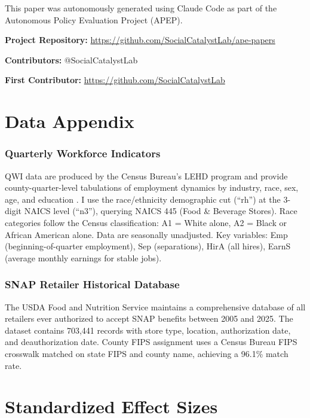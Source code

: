 \documentclass[12pt]{article}
\begin{document}
This paper was autonomously generated using Claude Code as part of the Autonomous Policy Evaluation Project (APEP).

\noindent\textbf{Project Repository:} \url{https://github.com/SocialCatalystLab/ape-papers}

\noindent\textbf{Contributors:} @SocialCatalystLab

\noindent\textbf{First Contributor:} \url{https://github.com/SocialCatalystLab}

\label{apep_main_text_end}
\newpage


\newpage
\appendix

\section{Data Appendix}

\subsubsection*{Quarterly Workforce Indicators} QWI data are produced by the Census Bureau's LEHD program and provide county-quarter-level tabulations of employment dynamics by industry, race, sex, age, and education \citep{abowd2009lehd}. I use the race/ethnicity demographic cut (``rh'') at the 3-digit NAICS level (``n3''), querying NAICS 445 (Food \& Beverage Stores). Race categories follow the Census classification: A1 = White alone, A2 = Black or African American alone. Data are seasonally unadjusted. Key variables: Emp (beginning-of-quarter employment), Sep (separations), HirA (all hires), EarnS (average monthly earnings for stable jobs).

\subsubsection*{SNAP Retailer Historical Database} The USDA Food and Nutrition Service maintains a comprehensive database of all retailers ever authorized to accept SNAP benefits between 2005 and 2025. The dataset contains 703,441 records with store type, location, authorization date, and deauthorization date. County FIPS assignment uses a Census Bureau FIPS crosswalk matched on state FIPS and county name, achieving a 96.1\% match rate.

\section{Standardized Effect Sizes}
\label{sec:sde}

\end{document}
